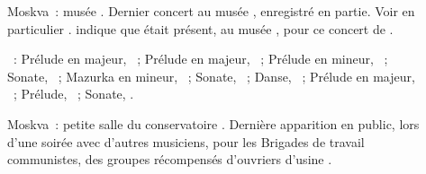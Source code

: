 \begin{description}
 \item[]
 Moskva~: musée \Scriabine{}.
 Dernier concert au musée \Scriabine{}, enregistré en partie.
 Voir en particulier \citet[p.~354]{Badeyan08}.
 \citet[p.~105]{Nikonovich08a} indique que \HNeuhaus{} était présent, au
 musée \Scriabine{}, pour ce concert de \VSofronitsky{}.

 \textsc{\Scriabine{}}~: Prélude en \kB \Flat majeur,  ~;
 Prélude en \kD \Flat majeur,  ~; Prélude en \kB \Flat
 mineur,  ~; Sonate, ~; Mazurka en \kE mineur,
  ~; Sonate, ~; Danse,  ~;
 Prélude en \kF \Sharp majeur,  ~; Prélude, 
 ~; Sonate, .
 \item[]
 Moskva~: petite salle du conservatoire \citep[voir][p.~61]{Juban}.
 Dernière apparition en public, lors d'une soirée avec d'autres musiciens,
 pour les Brigades de travail communistes, des groupes récompensés
 d'ouvriers d'usine \citep[p.~71]{White}.


\end{description}
